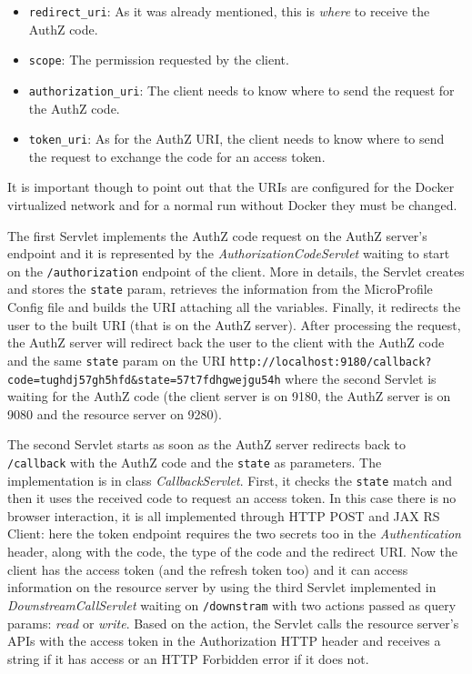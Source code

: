 \begin{itemize}
    \item \texttt{redirect\_uri}: As it was already mentioned, this is \textit{where} to receive the AuthZ code.
    \item \texttt{scope}: The permission requested by the client.
    \item \texttt{authorization\_uri}: The client needs to know where to send the request for the AuthZ code.
    \item \texttt{token\_uri}: As for the AuthZ URI, the client needs to know where to send the request to exchange the code for an access token.
\end{itemize}

\noindent It is important though to point out that the URIs are configured for the Docker virtualized network and for a normal run without Docker they must be changed.

The first Servlet implements the AuthZ code request on the AuthZ server's endpoint and it is represented by the \textit{AuthorizationCodeServlet} waiting to start on the \texttt{/authorization} endpoint of the client. More in details, the Servlet creates and stores the \texttt{state} param, retrieves the information from the MicroProfile Config file and builds the URI attaching all the variables. Finally, it redirects the user to the built URI (that is on the AuthZ server). After processing the request, the AuthZ server will redirect back the user to the client with the AuthZ code and the same \texttt{state} param on the URI \texttt{http://localhost:9180/callback?code=tughdj57gh5hfd\&state=57t7fdhgwejgu54h} where the second Servlet is waiting for the AuthZ code (the client server is on 9180, the AuthZ server is on 9080 and the resource server on 9280).

The second Servlet starts as soon as the AuthZ server redirects back to \texttt{/callback} with the AuthZ code and the \texttt{state} as parameters. The implementation is in class \textit{CallbackServlet}. First, it checks the \texttt{state} match and then it uses the received code to request an access token. In this case there is no browser interaction, it is all implemented through HTTP POST and JAX RS Client: here the token endpoint requires the two secrets too in the \textit{Authentication} header, along with the code, the type of the code and the redirect URI. Now the client has the access token (and the refresh token too) and it can access information on the resource server by using the third Servlet implemented in \textit{DownstreamCallServlet} waiting on \texttt{/downstram} with two actions passed as query params: \textit{read} or \textit{write}. Based on the action, the Servlet calls the resource server's APIs with the access token in the Authorization HTTP header and receives a string if it has access or an HTTP Forbidden error if it does not.


